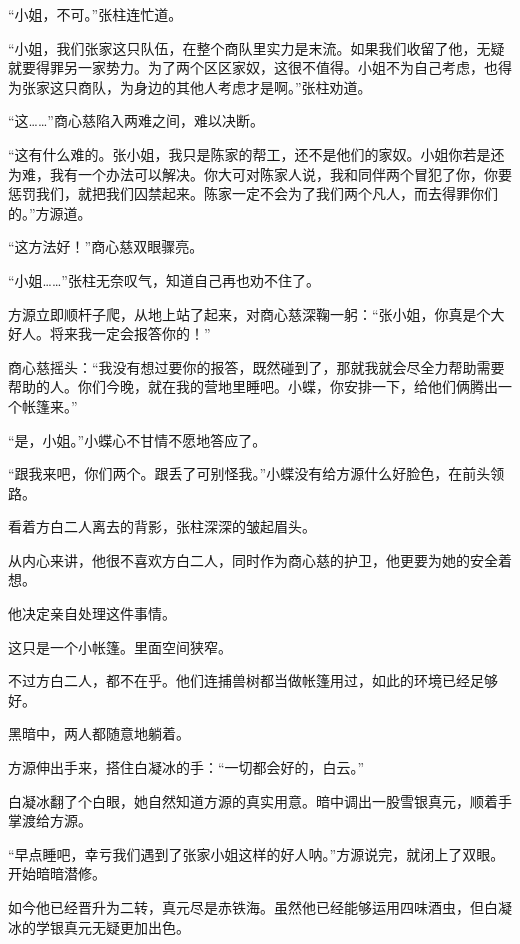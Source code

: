 
\begin{this_body}



“小姐，不可。”张柱连忙道。

“小姐，我们张家这只队伍，在整个商队里实力是末流。如果我们收留了他，无疑就要得罪另一家势力。为了两个区区家奴，这很不值得。小姐不为自己考虑，也得为张家这只商队，为身边的其他人考虑才是啊。”张柱劝道。

“这……”商心慈陷入两难之间，难以决断。

“这有什么难的。张小姐，我只是陈家的帮工，还不是他们的家奴。小姐你若是还为难，我有一个办法可以解决。你大可对陈家人说，我和同伴两个冒犯了你，你要惩罚我们，就把我们囚禁起来。陈家一定不会为了我们两个凡人，而去得罪你们的。”方源道。

“这方法好！”商心慈双眼骤亮。

“小姐……”张柱无奈叹气，知道自己再也劝不住了。

方源立即顺杆子爬，从地上站了起来，对商心慈深鞠一躬：“张小姐，你真是个大好人。将来我一定会报答你的！”

商心慈摇头：“我没有想过要你的报答，既然碰到了，那就我就会尽全力帮助需要帮助的人。你们今晚，就在我的营地里睡吧。小蝶，你安排一下，给他们俩腾出一个帐篷来。”

“是，小姐。”小蝶心不甘情不愿地答应了。

“跟我来吧，你们两个。跟丢了可别怪我。”小蝶没有给方源什么好脸色，在前头领路。

看着方白二人离去的背影，张柱深深的皱起眉头。

从内心来讲，他很不喜欢方白二人，同时作为商心慈的护卫，他更要为她的安全着想。

他决定亲自处理这件事情。

这只是一个小帐篷。里面空间狭窄。

不过方白二人，都不在乎。他们连捕兽树都当做帐篷用过，如此的环境已经足够好。

黑暗中，两人都随意地躺着。

方源伸出手来，搭住白凝冰的手：“一切都会好的，白云。”

白凝冰翻了个白眼，她自然知道方源的真实用意。暗中调出一股雪银真元，顺着手掌渡给方源。

“早点睡吧，幸亏我们遇到了张家小姐这样的好人呐。”方源说完，就闭上了双眼。开始暗暗潜修。

如今他已经晋升为二转，真元尽是赤铁海。虽然他已经能够运用四味酒虫，但白凝冰的学银真元无疑更加出色。


\end{this_body}
